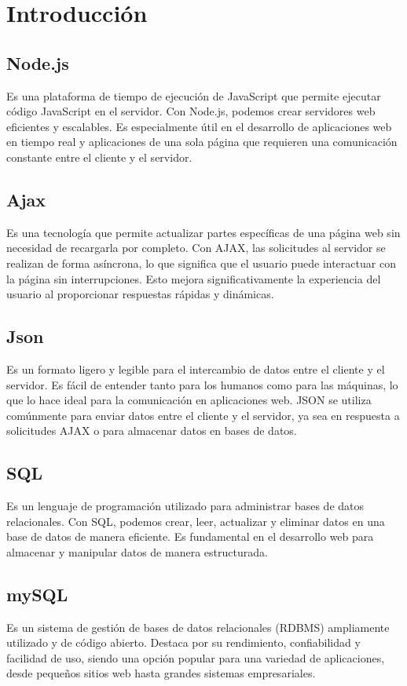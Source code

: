 \documentclass{article}
\begin{document}
  \section{Introducción}
  \subsection{Node.js}
    Es una plataforma de tiempo de ejecución de JavaScript que permite ejecutar código JavaScript en el servidor. 
    Con Node.js, podemos crear servidores web eficientes y escalables. Es especialmente útil en el desarrollo de 
    aplicaciones web en tiempo real y aplicaciones de una sola página que requieren una comunicación constante entre 
    el cliente y el servidor.
  \subsection{Ajax}
    Es una tecnología que permite actualizar partes específicas de una página web sin necesidad de recargarla por completo. 
    Con AJAX, las solicitudes al servidor se realizan de forma asíncrona, lo que significa que el usuario puede interactuar con 
    la página sin interrupciones. Esto mejora significativamente la experiencia del usuario al proporcionar respuestas rápidas y dinámicas.
  \subsection{Json}
    Es un formato ligero y legible para el intercambio de datos entre el cliente y el servidor. Es fácil de entender tanto 
    para los humanos como para las máquinas, lo que lo hace ideal para la comunicación en aplicaciones web. JSON se utiliza 
    comúnmente para enviar datos entre el cliente y el servidor, ya sea en respuesta a solicitudes AJAX o para almacenar datos 
    en bases de datos.
  \newpage
  \subsection{SQL}
    Es un lenguaje de programación utilizado para administrar bases de datos relacionales. Con SQL, podemos crear, leer, 
    actualizar y eliminar datos en una base de datos de manera eficiente. Es fundamental en el desarrollo web para almacenar 
    y manipular datos de manera estructurada.
  \subsection{mySQL}
    Es un sistema de gestión de bases de datos relacionales (RDBMS) ampliamente utilizado y de código abierto. 
    Destaca por su rendimiento, confiabilidad y facilidad de uso, siendo una opción popular para una variedad de aplicaciones, 
    desde pequeños sitios web hasta grandes sistemas empresariales.
  
\end{document}

